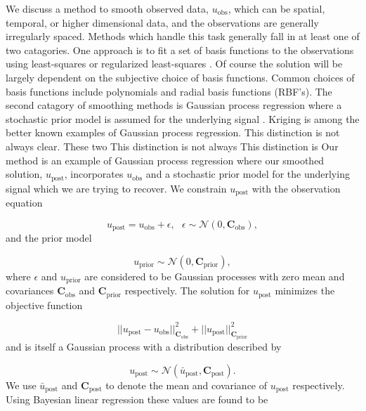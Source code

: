 \documentclass[10pt,a4paper]{article}
\begin{document}
We discuss a method to smooth observed data, $u_\mathrm{obs}$, which can be spatial, temporal, or higher dimensional data, and the observations are generally irregularly spaced.  Methods which handle this task generally fall in at least one of two catagories.  One approach is to fit a set of basis functions to the observations using least-squares or regularized least-squares \citep[e.g.][]{Fasshauer2007}.  Of course the solution will be largely dependent on the subjective choice of basis functions.  Common choices of basis functions include polynomials and radial basis functions (RBF's).  The second catagory of smoothing methods is Gaussian process regression where a stochastic prior model is assumed for the underlying signal \citep[e.g.][]{Rasmussen2006}.  Kriging is among the better known examples of Gaussian process regression.  This distinction is not always clear.   These two     This distinction is not always   This distinction is   Our method is an example of Gaussian process regression where our smoothed solution, $u_\mathrm{post}$, incorporates $u_\mathrm{obs}$ and a stochastic prior model for the underlying signal which we are trying to recover.  We constrain $u_\mathrm{post}$ with the observation equation

\begin{equation}\label{eq:Data}
  u_\mathrm{post} = u_\mathrm{obs} + \epsilon,\ \ \ \epsilon \sim \mathcal{N}(0,\mathbf{C}_\mathrm{obs}),
\end{equation}
and the prior model

\begin{equation}\label{eq:Prior}
  u_\mathrm{prior} \sim \mathcal{N}(0,\mathbf{C}_\mathrm{prior}),
\end{equation}
where $\epsilon$ and $u_\mathrm{prior}$ are considered to be Gaussian processes with zero mean and covariances $\mathbf{C}_\mathrm{obs}$ and $\mathbf{C}_\mathrm{prior}$ respectively.  The solution for $u_\mathrm{post}$ minimizes the objective function  

\begin{equation}\label{eq:Objective}
||u_\mathrm{post} - u_\mathrm{obs}||_{\mathbf{C}_\mathrm{obs}}^2 + 
||u_\mathrm{post}||_{\mathbf{C}_\mathrm{prior}}^2
\end{equation}
and is itself a Gaussian process with a distribution described by

\begin{equation}
  u_\mathrm{post} \sim \mathcal{N}(\bar{u}_\mathrm{post},\mathbf{C}_\mathrm{post}).
\end{equation}
We use $\bar{u}_\mathrm{post}$ and $\mathbf{C}_\mathrm{post}$ to denote the mean and covariance of $u_\mathrm{post}$ respectively.  Using Bayesian linear regression \citep[e.g.][]{Tarantola2005} these values are found to be  
\end{document}
